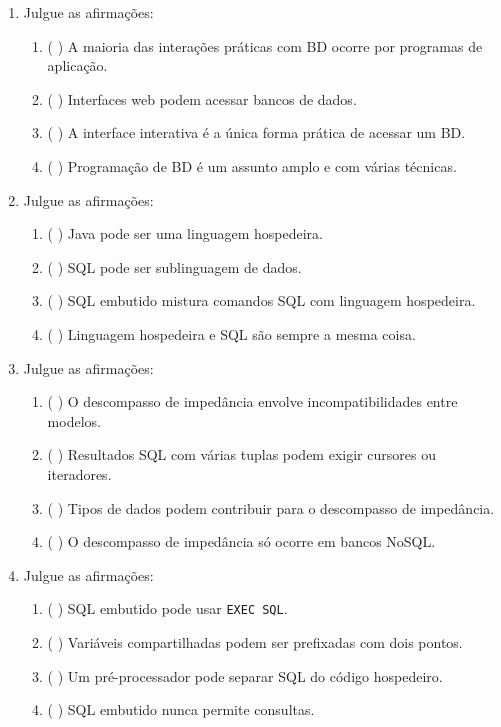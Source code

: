 \documentclass[12pt,a4paper]{article}
\begin{document}
\begin{enumerate}[resume,label=\textbf{Q\arabic*.}]

\item Julgue as afirmações:

\begin{enumerate}[label=\alph*)]
    \item ( \quad ) A maioria das interações práticas com BD ocorre por programas de aplicação.
    \item ( \quad ) Interfaces web podem acessar bancos de dados.
    \item ( \quad ) A interface interativa é a única forma prática de acessar um BD.
    \item ( \quad ) Programação de BD é um assunto amplo e com várias técnicas.
\end{enumerate}

\item Julgue as afirmações:

\begin{enumerate}[label=\alph*)]
    \item ( \quad ) Java pode ser uma linguagem hospedeira.
    \item ( \quad ) SQL pode ser sublinguagem de dados.
    \item ( \quad ) SQL embutido mistura comandos SQL com linguagem hospedeira.
    \item ( \quad ) Linguagem hospedeira e SQL são sempre a mesma coisa.
\end{enumerate}

\item Julgue as afirmações:

\begin{enumerate}[label=\alph*)]
    \item ( \quad ) O descompasso de impedância envolve incompatibilidades entre modelos.
    \item ( \quad ) Resultados SQL com várias tuplas podem exigir cursores ou iteradores.
    \item ( \quad ) Tipos de dados podem contribuir para o descompasso de impedância.
    \item ( \quad ) O descompasso de impedância só ocorre em bancos NoSQL.
\end{enumerate}

\item Julgue as afirmações:

\begin{enumerate}[label=\alph*)]
    \item ( \quad ) SQL embutido pode usar \texttt{EXEC SQL}.
    \item ( \quad ) Variáveis compartilhadas podem ser prefixadas com dois pontos.
    \item ( \quad ) Um pré-processador pode separar SQL do código hospedeiro.
    \item ( \quad ) SQL embutido nunca permite consultas.
\end{enumerate}


\end{enumerate}
\end{document}

